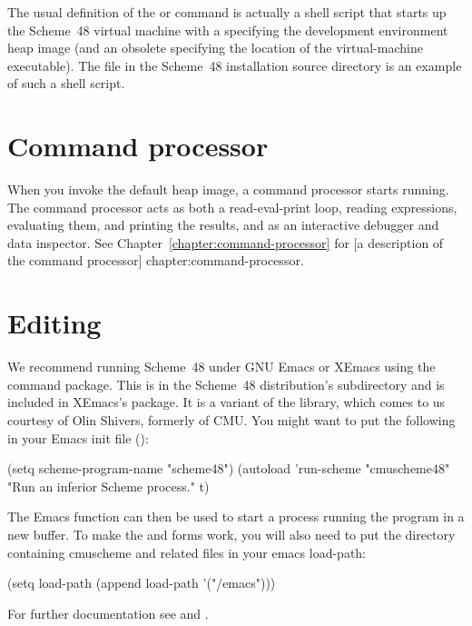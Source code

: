 The usual definition of the  or  command is actually a
 shell script that starts up the Scheme~48 virtual machine with a
specifying the development environment heap image (and an obsolete
  specifying the location of the virtual-machine
 executable).
The file  in the Scheme~48 installation source directory is an example
 of such a shell script.

\section{Command processor}

When you invoke the default heap image, a command processor starts
 running.
The command processor acts as both a read-eval-print loop, reading
 expressions, evaluating them, and printing the results, and as
 an interactive debugger and data inspector.
See Chapter~\ref{chapter:command-processor} for
[a description of the command processor]
{chapter:command-processor}.

\section{Editing}

We recommend running Scheme~48 under GNU Emacs or XEmacs using the
  command package.
This is in the Scheme~48 distribution's  subdirectory and
 is included in XEmacs's  package.
It is a variant of the  library, which
 comes to us courtesy of Olin Shivers, formerly of CMU.
You might want to put the following in your Emacs init file ():
\begin{example}
(setq scheme-program-name "scheme48")
(autoload 'run-scheme
          "cmuscheme48"
          "Run an inferior Scheme process."
          t)
\end{example}
The Emacs function  can then be used to start a process
 running the program  in a new buffer.
To make the  and  forms work, you will
also need
to put the directory containing cmuscheme and related files in your
emacs load-path:
\begin{example}
(setq load-path
  (append load-path '("/emacs")))
\end{example}
For further documentation see  and
.

